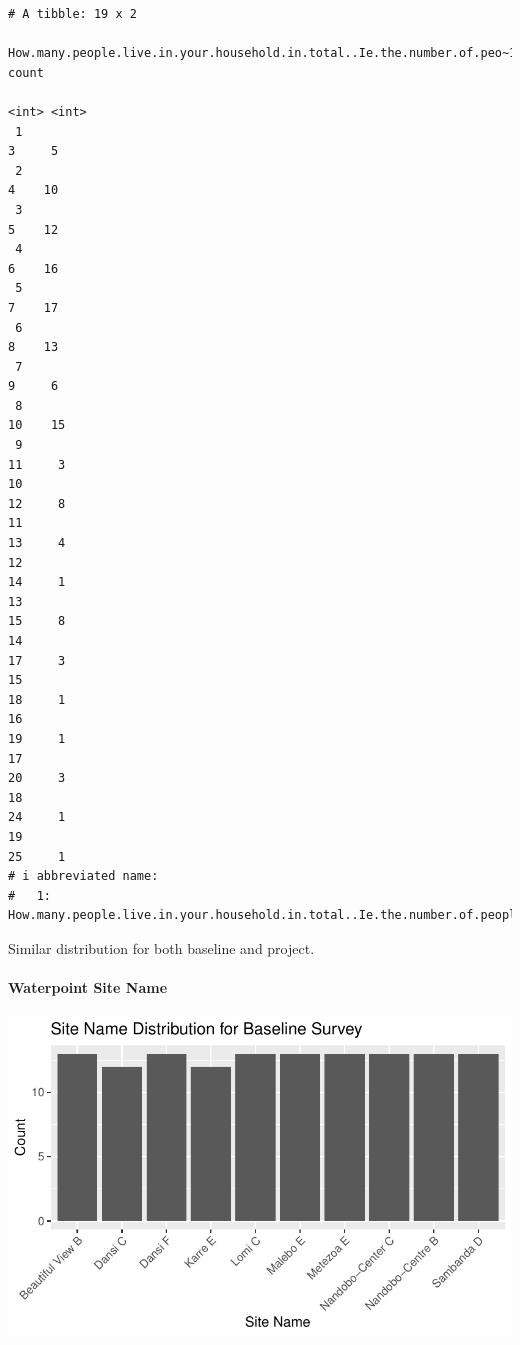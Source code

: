 \documentclass[
  letterpaper,
  DIV=11,
  numbers=noendperiod]{scrartcl}
\let\oldparagraph\paragraph
\renewcommand{\paragraph}[1]{\oldparagraph{#1}\mbox{}}
\begin{document}
\begin{verbatim}
# A tibble: 19 x 2
   How.many.people.live.in.your.household.in.total..Ie.the.number.of.peo~1 count
                                                                     <int> <int>
 1                                                                       3     5
 2                                                                       4    10
 3                                                                       5    12
 4                                                                       6    16
 5                                                                       7    17
 6                                                                       8    13
 7                                                                       9     6
 8                                                                      10    15
 9                                                                      11     3
10                                                                      12     8
11                                                                      13     4
12                                                                      14     1
13                                                                      15     8
14                                                                      17     3
15                                                                      18     1
16                                                                      19     1
17                                                                      20     3
18                                                                      24     1
19                                                                      25     1
# i abbreviated name:
#   1: How.many.people.live.in.your.household.in.total..Ie.the.number.of.people.living.under.this.roof..including.yourself..
\end{verbatim}

Similar distribution for both baseline and project.

\hypertarget{waterpoint-site-name}{%
\paragraph{Waterpoint Site Name}\label{waterpoint-site-name}}

\includegraphics{report_files/figure-pdf/unnamed-chunk-26-1.pdf}
\end{document}
